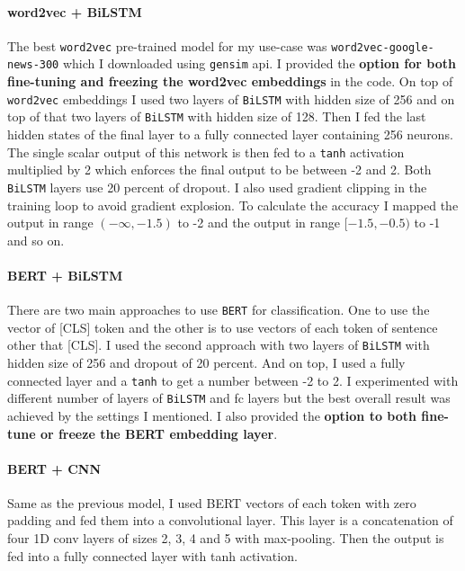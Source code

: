 \documentclass[11pt]{article}
\begin{document}
\paragraph{word2vec + BiLSTM}
The best \texttt{word2vec} pre-trained model for my use-case was \texttt{word2vec-google-news-300} which I downloaded using \texttt{gensim} api. I provided the \textbf{option for both fine-tuning and freezing the word2vec embeddings} in the code.
On top of \texttt{word2vec} embeddings I used two layers of \texttt{BiLSTM} with hidden size of 256 and on top of that two layers of \texttt{BiLSTM} with hidden size of 128. Then I fed the last hidden states of the final layer to a fully connected layer containing 256 neurons. The single scalar output of this network is then fed to a \texttt{tanh} activation multiplied by 2 which enforces the final output to be between -2 and 2.
Both \texttt{BiLSTM} layers use 20 percent of dropout. I also used gradient clipping in the training loop to avoid gradient explosion.
To calculate the accuracy I mapped the output in range $(-\infty, -1.5)$ to -2 and the output in range $[-1.5, -0.5)$ to -1 and so on.

\paragraph{BERT + BiLSTM}
There are two main approaches to use \texttt{BERT} for classification. One to use the vector of [CLS] token and the other is to use vectors of each token of sentence other that [CLS]. I used the second approach with two layers of \texttt{BiLSTM} with hidden size of 256 and dropout of 20 percent. And on top, I used a fully connected layer and a \texttt{tanh} to get a number between -2 to 2. I experimented with different number of layers of \texttt{BiLSTM} and fc layers but the best overall result was achieved by the settings I mentioned. I also provided the \textbf{option to both fine-tune or freeze the BERT embedding layer}.

\paragraph{BERT + CNN}
Same as the previous model, I used BERT vectors of each token with zero padding and fed them into a convolutional layer. This layer is a concatenation of four 1D conv layers of sizes 2, 3, 4 and 5 with max-pooling. Then the output is fed into a fully connected layer with tanh activation.
\end{document}
